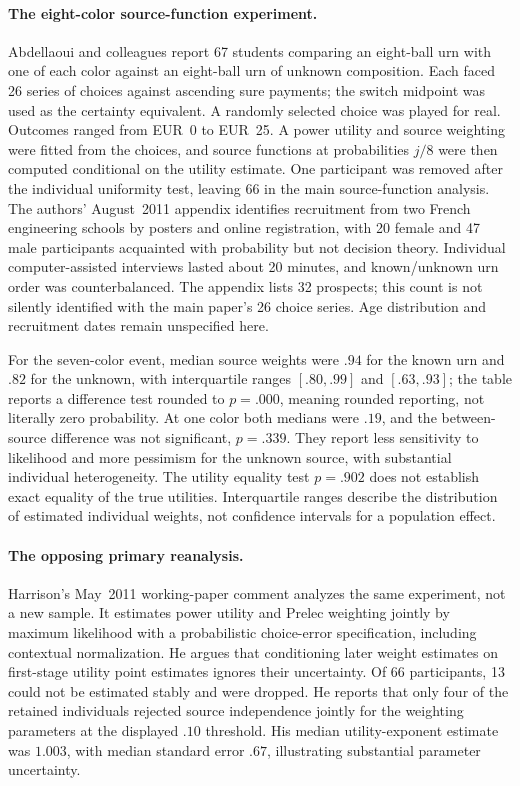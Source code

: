 \paragraph{The eight-color source-function experiment.}
Abdellaoui and colleagues report 67 students comparing an eight-ball
urn with one of each color against an eight-ball urn of unknown
composition. Each faced 26 series of choices against ascending sure
payments; the switch midpoint was used as the certainty equivalent.
A randomly selected choice was played for real. Outcomes ranged from
EUR~0 to EUR~25. A power utility and source weighting were fitted from
the choices, and source functions at probabilities \(j/8\) were
then computed conditional on the utility estimate. One participant was
removed after the individual uniformity test, leaving 66 in the main
source-function analysis. The authors' August~2011 appendix identifies
recruitment from two French engineering schools by posters and online
registration, with 20 female and 47 male participants acquainted with
probability but not decision theory. Individual computer-assisted
interviews lasted about 20 minutes, and known/unknown urn order was
counterbalanced. The appendix lists 32 prospects; this count is not
silently identified with the main paper's 26 choice series.
Age distribution and recruitment dates remain unspecified here.
\cite[Sec.~III, pp.~703--707]{AbdellaouiEtAl2011Sources}
\cite[Secs.~A.2--A.3, pp.~4--7]{AbdellaouiEtAl2011SourcesAppendix}

For the seven-color event, median source weights were \(.94\) for
the known urn and \(.82\) for the unknown, with interquartile ranges
\([.80,.99]\) and \([.63,.93]\); the table reports a difference
test rounded to \(p=.000\), meaning rounded reporting, not literally
zero probability. At one color both medians were \(.19\), and the
between-source difference was not significant, \(p=.339\).
They report less sensitivity to likelihood and more pessimism for
the unknown source, with substantial individual heterogeneity. The
utility equality test \(p=.902\) does not establish exact equality
of the true utilities. Interquartile ranges describe the distribution
of estimated individual weights, not confidence intervals for a
population effect.

\paragraph{The opposing primary reanalysis.}
Harrison's May~2011 working-paper comment analyzes the same experiment,
not a new sample. It estimates power utility and Prelec weighting jointly
by maximum likelihood with a probabilistic choice-error specification,
including contextual normalization. He argues that conditioning later
weight estimates on first-stage utility point estimates ignores their
uncertainty. Of 66 participants, 13 could not be estimated stably and
were dropped. He reports that only four of the retained individuals
rejected source independence jointly for the weighting parameters at
the displayed \(.10\) threshold. His median utility-exponent estimate
was \(1.003\), with median standard error \(.67\), illustrating
substantial parameter uncertainty.
\cite[pp.~3--9, table~1]{Harrison2011SourcesComment}

